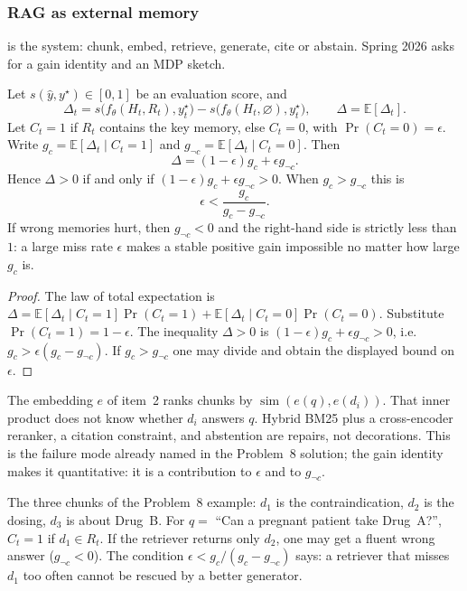 \subsubsection{RAG as external memory}
\label{subsubsec:nlpu-rag}

 is the system: chunk, embed, retrieve, generate, cite or abstain. Spring 2026 asks for a gain identity and an MDP sketch.

\begin{proposition}
\label{prop:nlpu-gain}
Let $s(\hat y,y^\star)\in[0,1]$ be an evaluation score, and
\[
\Delta_t
=
s\bigl(f_\theta(H_t,R_t),y_t^\star\bigr)
-
s\bigl(f_\theta(H_t,\varnothing),y_t^\star\bigr),
\qquad
\Delta
=
\mathbb{E}[\Delta_t].
\]
Let $C_t=1$ if $R_t$ contains the key memory, else $C_t=0$, with $\Pr(C_t=0)=\epsilon$. Write $g_c=\mathbb{E}[\Delta_t\mid C_t=1]$ and $g_{\neg c}=\mathbb{E}[\Delta_t\mid C_t=0]$. Then
\[
\Delta
=
(1-\epsilon)g_c+\epsilon g_{\neg c}.
\]
Hence $\Delta>0$ if and only if $(1-\epsilon)g_c+\epsilon g_{\neg c}>0$. When $g_c>g_{\neg c}$ this is
\[
\epsilon
<
\frac{g_c}{g_c-g_{\neg c}}.
\]
If wrong memories hurt, then $g_{\neg c}<0$ and the right-hand side is strictly less than $1$: a large miss rate $\epsilon$ makes a stable positive gain impossible no matter how large $g_c$ is.
\end{proposition}

\begin{proof}
The law of total expectation is $\Delta=\mathbb{E}[\Delta_t\mid C_t=1]\Pr(C_t=1)+\mathbb{E}[\Delta_t\mid C_t=0]\Pr(C_t=0)$. Substitute $\Pr(C_t=1)=1-\epsilon$. The inequality $\Delta>0$ is $(1-\epsilon)g_c+\epsilon g_{\neg c}>0$, i.e.\ $g_c>\epsilon(g_c-g_{\neg c})$. If $g_c>g_{\neg c}$ one may divide and obtain the displayed bound on $\epsilon$.
\end{proof}

\begin{remark}
\label{rem:nlpu-sim-not-entail}
The embedding $e$ of item~2 ranks chunks by $\operatorname{sim}(e(q),e(d_i))$. That inner product does not know whether $d_i$ answers $q$. Hybrid BM25 plus a cross-encoder reranker, a citation constraint, and abstention are repairs, not decorations. This is the failure mode already named in the Problem~8 solution; the gain identity makes it quantitative: it is a contribution to $\epsilon$ and to $g_{\neg c}$.
\end{remark}

\begin{example}
\label{exmp:nlpu-drug}
The three chunks of the Problem~8 example: $d_1$ is the contraindication, $d_2$ is the dosing, $d_3$ is about Drug~B. For $q=$ ``Can a pregnant patient take Drug~A?'', $C_t=1$ if $d_1\in R_t$. If the retriever returns only $d_2$, one may get a fluent wrong answer ($g_{\neg c}<0$). The condition $\epsilon<g_c/(g_c-g_{\neg c})$ says: a retriever that misses $d_1$ too often cannot be rescued by a better generator.
\end{example}

